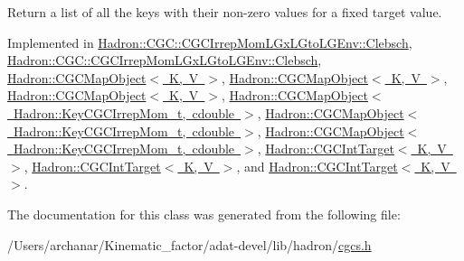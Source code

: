 Return a list of all the keys with their non-\/zero values for a fixed target value. 



Implemented in \mbox{\hyperlink{classHadron_1_1CGC_1_1CGCIrrepMomLGxLGtoLGEnv_1_1Clebsch_a8a003db7855154fba35df2485da43353}{Hadron\+::\+C\+G\+C\+::\+C\+G\+C\+Irrep\+Mom\+L\+Gx\+L\+Gto\+L\+G\+Env\+::\+Clebsch}}, \mbox{\hyperlink{classHadron_1_1CGC_1_1CGCIrrepMomLGxLGtoLGEnv_1_1Clebsch_a8a003db7855154fba35df2485da43353}{Hadron\+::\+C\+G\+C\+::\+C\+G\+C\+Irrep\+Mom\+L\+Gx\+L\+Gto\+L\+G\+Env\+::\+Clebsch}}, \mbox{\hyperlink{classHadron_1_1CGCMapObject_aeb342dc81f17743a25b969f540db4edf}{Hadron\+::\+C\+G\+C\+Map\+Object$<$ K, V $>$}}, \mbox{\hyperlink{classHadron_1_1CGCMapObject_aeb342dc81f17743a25b969f540db4edf}{Hadron\+::\+C\+G\+C\+Map\+Object$<$ K, V $>$}}, \mbox{\hyperlink{classHadron_1_1CGCMapObject_aeb342dc81f17743a25b969f540db4edf}{Hadron\+::\+C\+G\+C\+Map\+Object$<$ K, V $>$}}, \mbox{\hyperlink{classHadron_1_1CGCMapObject_aeb342dc81f17743a25b969f540db4edf}{Hadron\+::\+C\+G\+C\+Map\+Object$<$ Hadron\+::\+Key\+C\+G\+C\+Irrep\+Mom\+\_\+t, cdouble $>$}}, \mbox{\hyperlink{classHadron_1_1CGCMapObject_aeb342dc81f17743a25b969f540db4edf}{Hadron\+::\+C\+G\+C\+Map\+Object$<$ Hadron\+::\+Key\+C\+G\+C\+Irrep\+Mom\+\_\+t, cdouble $>$}}, \mbox{\hyperlink{classHadron_1_1CGCMapObject_aeb342dc81f17743a25b969f540db4edf}{Hadron\+::\+C\+G\+C\+Map\+Object$<$ Hadron\+::\+Key\+C\+G\+C\+Irrep\+Mom\+\_\+t, cdouble $>$}}, \mbox{\hyperlink{classHadron_1_1CGCIntTarget_a5946627ddb796961b97b7e0c57e32d83}{Hadron\+::\+C\+G\+C\+Int\+Target$<$ K, V $>$}}, \mbox{\hyperlink{classHadron_1_1CGCIntTarget_a5946627ddb796961b97b7e0c57e32d83}{Hadron\+::\+C\+G\+C\+Int\+Target$<$ K, V $>$}}, and \mbox{\hyperlink{classHadron_1_1CGCIntTarget_a5946627ddb796961b97b7e0c57e32d83}{Hadron\+::\+C\+G\+C\+Int\+Target$<$ K, V $>$}}.



The documentation for this class was generated from the following file\+:\begin{DoxyCompactItemize}
\item 
/\+Users/archanar/\+Kinematic\+\_\+factor/adat-\/devel/lib/hadron/\mbox{\hyperlink{adat-devel_2lib_2hadron_2cgcs_8h}{cgcs.\+h}}\end{DoxyCompactItemize}
